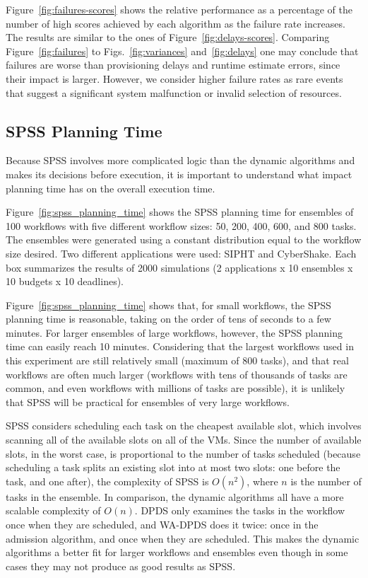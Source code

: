 \documentclass[preprint,5p]{elsarticle}
\begin{document}
Figure~\ref{fig:failures-scores} shows the relative performance as a percentage of
the number of high scores achieved by each algorithm as the failure rate
increases. The results are similar to the ones of
Figure~\ref{fig:delays-scores}. Comparing Figure~\ref{fig:failures} to
Figs.~\ref{fig:variances} and~\ref{fig:delays} one may conclude that failures
are worse than provisioning delays and runtime estimate errors, since their
impact is larger. However, we consider higher failure rates as rare events that
suggest a significant system malfunction or invalid selection of resources.





\subsection{SPSS Planning Time}

Because SPSS involves more complicated logic than the dynamic algorithms and
makes its decisions before execution, it is important to understand what
impact planning time has on the overall execution time.

Figure~\ref{fig:spss_planning_time} shows the SPSS planning time for ensembles
of 100 workflows with five different workflow sizes: 50, 200, 400, 600, and
800 tasks. The ensembles were generated using a constant distribution equal to
the workflow size desired. Two different applications were used: SIPHT and
CyberShake. Each box summarizes the results of 2000 simulations (2
applications x 10 ensembles x 10 budgets x 10 deadlines).

Figure~\ref{fig:spss_planning_time} shows that, for small workflows, the SPSS
planning time is reasonable, taking on the order of tens of seconds to a few
minutes. For larger ensembles of large workflows, however, the SPSS planning
time can easily reach 10 minutes. Considering that the largest workflows used
in this experiment are still relatively small (maximum of 800 tasks), and that
real workflows are often much larger (workflows with tens of thousands of
tasks are common, and even workflows with millions of
tasks are possible), it is unlikely that SPSS will be practical for
ensembles of very large workflows.


SPSS considers scheduling each task on the cheapest available slot, which
involves scanning all of the available slots on all of the VMs. Since the number
of available slots, in the worst case, is proportional to the number of tasks
scheduled (because scheduling a task splits an existing slot into at most two
slots: one before the task, and one after), the complexity of SPSS is
$O(n^2)$, where $n$ is the number of tasks in the ensemble. In comparison, the
dynamic algorithms all have a more scalable complexity of $O(n)$. DPDS only
examines the tasks in the workflow once when they are scheduled, and WA-DPDS
does it twice: once in the admission algorithm, and once when they are
scheduled. This makes the dynamic algorithms a better fit for larger workflows
and ensembles even though in some cases they may not produce as good results
as SPSS.
\end{document}
